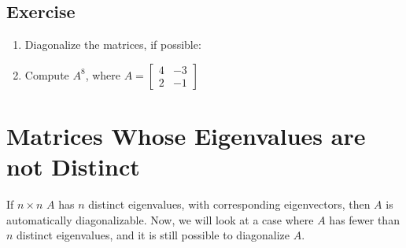 \documentclass[aima104_lecturenotes_ku.tex]{subfiles}
\begin{document}
\subsection{Exercise}
\begin{enumerate}
\item Diagonalize the matrices, if possible:
\begin{enumerate}[i).]

  \end{enumerate}

\item Compute $A^8$, where $A =
  \begin{bmatrix}
    4 & -3 \\
    2 & -1
  \end{bmatrix}$
\end{enumerate}

\section{Matrices Whose Eigenvalues are not Distinct}
If $n\times n$ $A$ has $n$ distinct eigenvalues, with corresponding eigenvectors, then $A$ is automatically diagonalizable. Now, we will look at a case where $A$ has fewer than $n$ distinct eigenvalues, and it is still possible to diagonalize $A$.
\end{document}
